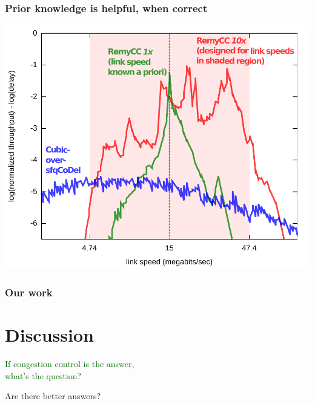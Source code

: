 \documentclass[svgnames]{beamer}
\begin{document}
\begin{frame}
\frametitle{Prior knowledge is helpful, when correct}

\noindent \includegraphics[width=8.5 cm]{spec2.pdf}

\end{frame}

\begin{frame}

\frametitle{Our work}
\section{Discussion}

\begin{centering}

\LARGE \textcolor{DarkGreen}{If congestion control is the answer,\\what's the question?}

\vspace{\baselineskip}

\LARGE \textcolor{NavyBlue}{Are there better answers?}

\end{centering}

\end{frame}
\end{document}
